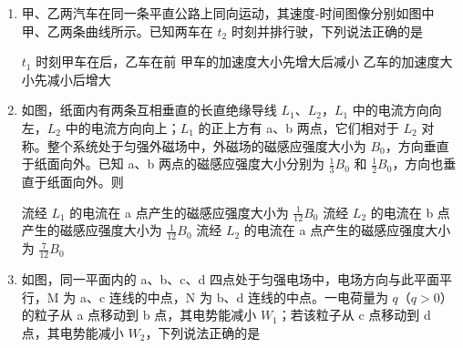 \documentclass[\gkver]{gaokaozhenti}
\begin{document}
\begin{enumerate}
\item
甲、乙两汽车在同一条平直公路上同向运动，其速度-时间图像分别如图中甲、乙两条曲线所示。已知两车在 $t_{2}$ 时刻并排行驶，下列说法正确的是


{$t_{1}$ 时刻甲车在后，乙车在前}
{甲车的加速度大小先增大后减小}
{乙车的加速度大小先减小后增大}


\item
如图，纸面内有两条互相垂直的长直绝缘导线 $L_{1}$、$L_{2}$，$L_{1}$ 中的电流方向向左，$L_{2}$ 中的电流方向向上；$L_{1}$ 的正上方有 a、b 两点，它们相对于 $L_{2}$ 对称。整个系统处于匀强外磁场中，外磁场的磁感应强度大小为 $B_{0}$，方向垂直于纸面向外。已知 a、b 两点的磁感应强度大小分别为 $\frac{1}{3}B_{0}$ 和 $\frac{1}{2}B_{0}$，方向也垂直于纸面向外。则

\onepicture[w=3.80cm]{}

{流经 $L_{1}$ 的电流在 a 点产生的磁感应强度大小为 $\frac{1}{12}B_{0}$}
{流经 $L_{2}$ 的电流在 b 点产生的磁感应强度大小为 $\frac{1}{12}B_{0}$}
{流经 $L_{2}$ 的电流在 a 点产生的磁感应强度大小为 $\frac{7}{12}B_{0}$}


\item
如图，同一平面内的 a、b、c、d 四点处于匀强电场中，电场方向与此平面平行，M 为 a、c 连线的中点，N 为 b、d 连线的中点。一电荷量为 $q$（$q>0$）的粒子从 a 点移动到 b 点，其电势能减小 $W_{1}$；若该粒子从 c 点移动到 d 点，其电势能减小 $W_{2}$，下列说法正确的是


\end{enumerate}
\end{document}
